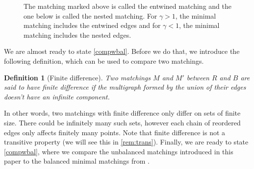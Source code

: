 \documentclass{article}
\newtheorem{definition}{Definition}
\begin{document}
\begin{enumerate}
\begin{figure}[h]
  \centering
{}
  \caption{The matching marked above is called the entwined matching
  and the one below is called the nested matching. For $\gamma>1$, the
  minimal matching includes the entwined edges and for $\gamma<1$, the
  minimal matching includes the nested edges.}\label{fig:config}
  \end{figure}



\end{enumerate}


We are almost ready to state \cref{compwbal}. Before we do that, we introduce the
following definition, which can be used to compare two matchings.


\begin{definition}[Finite difference]
  Two matchings $M$ and $M'$ between $R$ and $B$ are said to have
  finite difference if the multigraph formed by the union of their
  edges doesn't have an infinite component.
\end{definition}


In other words, two matchings with finite difference only differ on sets of finite size. There could be infinitely many such sets, however each chain
of reordered edges only affects finitely many points. Note that finite
difference is not a transitive property (we will see this in
\cref{rem:trans}). Finally, we are
ready to state \cref{compwbal}, where we compare the
unbalanced matchings introduced in this paper to the balanced minimal
matchings from \cite{minimal}.
\end{document}
